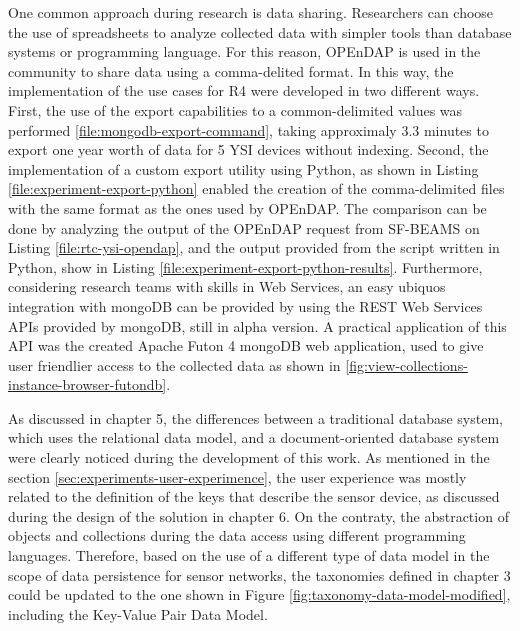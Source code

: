 One common approach during research is data sharing. Researchers can choose
the use of spreadsheets to analyze collected data with simpler tools than
database systems or programming language. For this reason, OPEnDAP is used in
the community to share data using a comma-delited format. In this way, the
implementation of the use cases for R4 were developed in two different ways.
First, the use of the export capabilities to a common-delimited values was
performed \ref{file:mongodb-export-command}, taking approximaly 3.3 minutes to
export one year worth of data for 5 YSI devices without indexing. Second, the
implementation of a custom export utility using Python, as shown in Listing
\ref{file:experiment-export-python} enabled the creation of the comma-delimited
files with the same format as the ones used by OPEnDAP. The comparison can be
done by analyzing the output of the OPEnDAP request from SF-BEAMS on Listing
\ref{file:rtc-ysi-opendap}, and the output provided from the script written in
Python, show in Listing \ref{file:experiment-export-python-results}.
Furthermore, considering research teams with skills in Web Services, an easy
ubiquos integration with mongoDB can be provided by using the REST Web Services
APIs provided by mongoDB, still in alpha version. A practical application of
this API was the created Apache Futon 4 mongoDB web application, used to give
user friendlier access to the collected data as shown in 
\ref{fig:view-collections-instance-browser-futondb}. 
 
As discussed in chapter 5, the differences between a traditional database
system, which uses the relational data model, and a document-oriented database
system were clearly noticed during the development of this work. As mentioned
in the section \ref{sec:experiments-user-experimence}, the user experience was
mostly related to the definition of the keys that describe the sensor device,
as discussed during the design of the solution in chapter 6. On the contraty,
the abstraction of objects and collections during the data access using
different programming languages. Therefore, based on the use of a different
type of data model in the scope of data persistence for sensor networks, the
taxonomies defined in chapter 3 could be updated to the one shown in Figure
\ref{fig:taxonomy-data-model-modified}, including the Key-Value Pair Data
Model.

